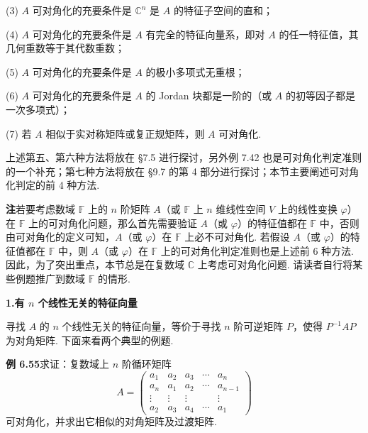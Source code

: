 \documentclass[UTF8,12pt,a4paper,fontset=fandol]{ctexart}
\begin{document}
(3) $A$ 可对角化的充要条件是 $\mathbb{C}^n$ 是 $A$ 的特征子空间的直和；

(4) $A$ 可对角化的充要条件是 $A$ 有完全的特征向量系，即对 $A$ 的任一特征值，其几何重数等于其代数重数；

(5) $A$ 可对角化的充要条件是 $A$ 的极小多项式无重根；

(6) $A$ 可对角化的充要条件是 $A$ 的 Jordan 块都是一阶的（或 $A$ 的初等因子都是一次多项式）；

(7) 若 $A$ 相似于实对称矩阵或复正规矩阵，则 $A$ 可对角化.

上述第五、第六种方法将放在 §7.5 进行探讨，另外例 7.42 也是可对角化判定准则的一个补充；第七种方法将放在 §9.7 的第 4 部分进行探讨；本节主要阐述可对角化判定的前 4 种方法.

\noindent\textbf{注}\quad 若要考虑数域 $\mathbb{F}$ 上的 $n$ 阶矩阵 $A$（或 $\mathbb{F}$ 上 $n$ 维线性空间 $V$ 上的线性变换 $\varphi$）在 $\mathbb{F}$ 上的可对角化问题，那么首先需要验证 $A$（或 $\varphi$）的特征值都在 $\mathbb{F}$ 中，否则由可对角化的定义可知，$A$（或 $\varphi$）在 $\mathbb{F}$ 上必不可对角化. 若假设 $A$（或 $\varphi$）的特征值都在 $\mathbb{F}$ 中，则 $A$（或 $\varphi$）在 $\mathbb{F}$ 上的可对角化判定准则也是上述前 6 种方法. 因此，为了突出重点，本节总是在复数域 $\mathbb{C}$ 上考虑可对角化问题. 请读者自行将某些例题推广到数域 $\mathbb{F}$ 的情形.

\noindent\textbf{1.\quad 有 $n$ 个线性无关的特征向量}

寻找 $A$ 的 $n$ 个线性无关的特征向量，等价于寻找 $n$ 阶可逆矩阵 $P$，使得 $P^{-1}AP$ 为对角矩阵. 下面来看两个典型的例题.

\noindent\textbf{例 6.55}\quad 求证：复数域上 $n$ 阶循环矩阵
\[
A=\left(\begin{array}{ccccc}
a_1 & a_2 & a_3 & \cdots & a_n\\
a_n & a_1 & a_2 & \cdots & a_{n-1}\\
\vdots & \vdots & \vdots & & \vdots\\
a_2 & a_3 & a_4 & \cdots & a_1
\end{array}\right)
\]
可对角化，并求出它相似的对角矩阵及过渡矩阵.
\end{document}
